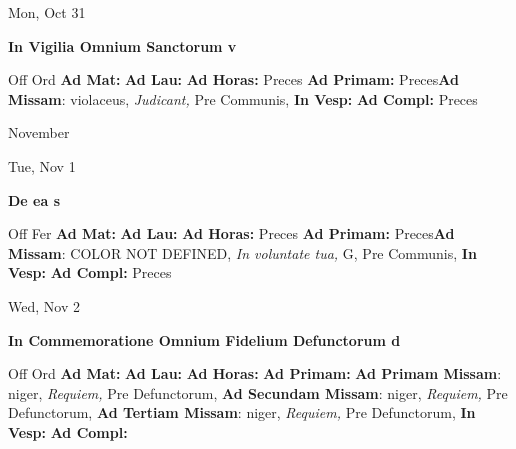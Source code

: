 \documentclass[10pt]{memoir}
\begin{document}
\begin{center}
\begin{minipage}{3.5in}
\vspace{2em}
\begin{center}Mon, Oct 31
\end{center}
\textbf{ \large In Vigilia Omnium Sanctorum
\textnormal{\normalsize v}}

\begin{justify}Off Ord
\textbf{Ad Mat: }
\textbf{Ad Lau: }
\textbf{Ad Horas: }Preces
\textbf{Ad Primam: }Preces\textbf{Ad Missam}: violaceus, \textit{Judicant,} Pre Communis, 
\textbf{In Vesp: }
\textbf{Ad Compl: }Preces
\end{justify}
\end{minipage}
\end{center}

\begin{center}
\pagebreak
\thispagestyle{empty}
{\Huge November}
\end{center}
                    
\begin{center}
\begin{minipage}{3.5in}
\vspace{2em}
\begin{center}Tue, Nov 1
\end{center}
\textbf{ \large De ea
\textnormal{\normalsize s}}

\begin{justify}Off Fer
\textbf{Ad Mat: }
\textbf{Ad Lau: }
\textbf{Ad Horas: }Preces
\textbf{Ad Primam: }Preces\textbf{Ad Missam}: COLOR NOT DEFINED, \textit{In voluntate tua,} G, Pre Communis, 
\textbf{In Vesp: }
\textbf{Ad Compl: }Preces
\end{justify}
\end{minipage}
\end{center}

\begin{center}
\begin{minipage}{3.5in}
\vspace{2em}
\begin{center}Wed, Nov 2
\end{center}
\textbf{ \large In Commemoratione Omnium Fidelium Defunctorum
\textnormal{\normalsize d}}

\begin{justify}Off Ord
\textbf{Ad Mat: }
\textbf{Ad Lau: }
\textbf{Ad Horas: }
\textbf{Ad Primam: }\textbf{Ad Primam Missam}: niger, \textit{Requiem,} Pre Defunctorum, \textbf{Ad Secundam Missam}: niger, \textit{Requiem,} Pre Defunctorum, \textbf{Ad Tertiam Missam}: niger, \textit{Requiem,} Pre Defunctorum, 
\textbf{In Vesp: }
\textbf{Ad Compl: }
\end{justify}
\end{minipage}
\end{center}
\end{document}
